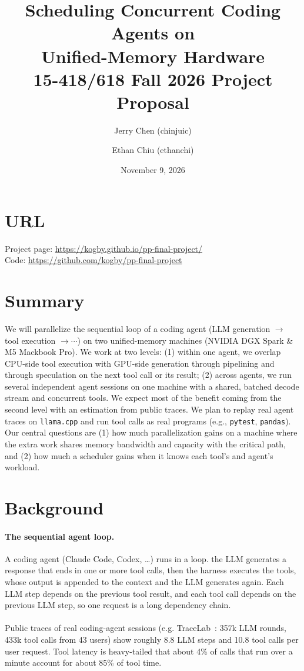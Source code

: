 \documentclass[11pt]{article}
\title{Scheduling Concurrent Coding Agents on\\
  Unified-Memory Hardware\\[6pt]
  \large 15-418/618 Fall 2026 Project Proposal}
\author{Jerry Chen (chinjuic) \and Ethan Chiu (ethanchi)}
\date{November 9, 2026}
\newcommand{\code}[1]{\texttt{#1}}
\begin{document}
\maketitle

\section*{URL}
Project page: \url{https://kogby.github.io/pp-final-project/}\\
Code: \url{https://github.com/kogby/pp-final-project}

\section*{Summary}
We will parallelize the sequential loop of a coding agent (LLM generation
$\rightarrow$ tool execution $\rightarrow\cdots$) on two unified-memory machines (NVIDIA DGX Spark \& M5 Mackbook Pro).
We work at two levels: (1) within one agent, we overlap CPU-side tool execution with GPU-side generation through pipelining and through speculation on the next tool call or its result; (2) across agents, we run several independent agent sessions on one machine with a shared, batched decode stream and concurrent tools. We expect most of the benefit coming from the second level with an estimation from public traces.
We plan to replay real agent traces on \code{llama.cpp} and run tool calls as real programs (e.g., \code{pytest}, \code{pandas}).
Our central questions are (1) how much parallelization gains on a machine where the extra work shares memory bandwidth and capacity with the critical path, and (2) how much a scheduler gains when it knows each tool's and agent's workload.


\section*{Background}

\paragraph{The sequential agent loop.}
A coding agent (Claude Code, Codex, \ldots) runs in a loop. the LLM generates a response that ends in one or more tool calls, then the harness executes the tools, whose output is appended to the context and the LLM generates again. 
Each LLM step depends on the previous tool result, and each tool call
depends on the previous LLM step, so one request is a long dependency chain.
\\
\\
Public traces of real coding-agent sessions (e.g. TraceLab~\cite{tracelab}: 357k LLM rounds, 433k tool calls from 43 users) show roughly 8.8 LLM steps and 10.8 tool calls per user request. Tool latency is heavy-tailed that about 4\% of calls that run over a minute account for about 85\% of tool time.
\end{document}
